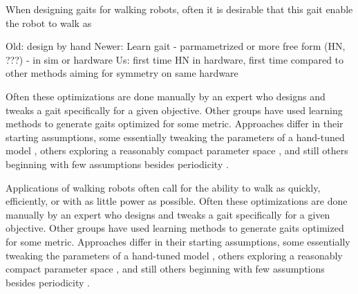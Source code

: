 When designing gaits for walking robots, often it is desirable that
this gait enable the robot to walk as

Old: design by hand
Newer: Learn gait
  - parmametrized or more free form (HN, ???)
  - in sim or hardware
Us: first time HN in hardware, first time compared to other methods aiming for symmetry on same hardware

Often
these optimizations are done manually by an expert who designs and
tweaks a gait specifically for a given objective.  Other groups have
used learning methods to generate gaits optimized for some metric.
Approaches differ in their starting assumptions, some essentially
tweaking the parameters of a hand-tuned model \cite{chernova}, others
exploring a reasonably compact parameter space \cite{kohl}, and still
others beginning with few assumptions besides periodicity
\cite{zykov}.












Applications of walking robots often call for the ability to walk as
quickly, efficiently, or with as little power as possible.  Often
these optimizations are done manually by an expert who designs and
tweaks a gait specifically for a given objective.  Other groups have
used learning methods to generate gaits optimized for some metric.
Approaches differ in their starting assumptions, some essentially
tweaking the parameters of a hand-tuned model \cite{chernova}, others
exploring a reasonably compact parameter space \cite{kohl}, and still
others beginning with few assumptions besides periodicity
\cite{zykov}.

